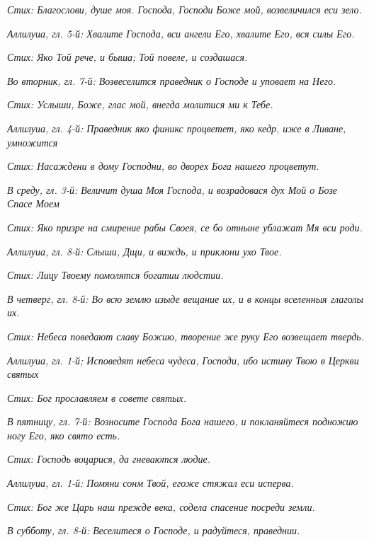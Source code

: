 \itshape Стих:\normalfont{} Благослови, душе моя. Господа, Господи Боже мой, возвеличился еси зело.


\itshape Аллилуиа, гл. 5-й:\normalfont{} Хвалите Господа, вси ангели Его, хвалите Его, вся силы Его.


\itshape Стих:\normalfont{} Яко Той рече, и быша; Той повеле, и создашася.


\itshape Во вторник, гл. 7-й:\normalfont{} Возвеселится праведник о Господе и уповает на Него.


\itshape Стих:\normalfont{} Услыши, Боже, глас мой, внегда молитися ми к Тебе.


\itshape Аллилуиа, гл. 4-й:\normalfont{} Праведник яко финикс процветет, яко кедр, иже в Ливане, умножится


\itshape Стих:\normalfont{} Насаждени в дому Господни, во дворех Бога нашего процветут.


\itshape В среду, гл. 3-й:\normalfont{} Величит душа Моя Господа, и возрадовася дух Мой о Бозе Спасе Моем


\itshape Стих:\normalfont{} Яко призре на смирение рабы Своея, се бо отныне ублажат Мя вси роди.


\itshape Аллилуиа, гл. 8-й:\normalfont{} Слыши, Дщи, и виждь, и приклони ухо Твое.


\itshape Стих:\normalfont{} Лицу Твоему помолятся богатии людстии.


\itshape В четверг, гл. 8-й:\normalfont{} Во всю землю изыде вещание их, и в концы вселенныя глаголы их.


\itshape Стих:\normalfont{} Небеса поведают славу Божию, творение же руку Его возвещает твердь.


\itshape  Аллилуиа, гл. 1-й;\normalfont{} Исповедят небеса чудеса, Господи, ибо истину Твою в Церкви святых


\itshape Стих:\normalfont{} Бог прославляем в совете святых.


\itshape В пятницу, гл. 7-й:\normalfont{} Возносите Господа Бога нашего, и покланяйтеся подножию ногу Его, яко свято есть.


\itshape Стих:\normalfont{} Господь воцарися, да гневаются людие.


\itshape Аллилуиа, гл. 1-й:\normalfont{} Помяни сонм Твой, егоже стяжал еси исперва.


\itshape Стих:\normalfont{} Бог же Царь наш прежде века, содела спасение посреди земли.


\itshape В субботу, гл. 8-й:\normalfont{} Веселитеся о Господе, и радуйтеся, праведнии.


